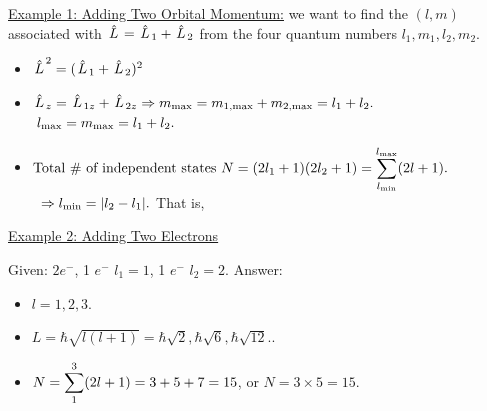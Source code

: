 \documentclass{school-22.101-notes}
\begin{document}
\uline{Example 1: Adding Two Orbital Momentum:} we want to find the $(l,m)$ associated with $\left. \hat{L} \right.= \left. \hat{L} \right._1 + \left. \hat{L} \right._2$ from the four quantum numbers $l_1, m_1, l_2, m_2$. 
\begin{itemize}
\item $\left. \hat{L} \right.^2 = (\left. \hat{L} \right._1 + \left. \hat{L} \right._2)^2 $
\item $ \left. \hat{L} \right._z = \left. \hat{L} \right._{1z} + \left. \hat{L} \right._{2z} \Rightarrow m_{\mathrm{max}} = m_{\mathrm{1,max}} + m_{\mathrm{2,max}} = l_1 + l_2.$
$\mbox{ } l_{\mathrm{max}} = m_{\mathrm{max}} = l_1 + l_2.$
\item $ \mbox{Total \# of independent states } N = (2 l_1 + 1) (2l_2 + 1) = \displaystyle\sum_{l_{\mathrm{min}}}^{l_{\mathrm{max}}} (2l+1).$
$\mbox{ }\Rightarrow l_{\mathrm{min}} = |l_2 - l_1 |.$ That is,
\end{itemize}

\uline{Example 2: Adding Two Electrons}

Given: $ 2e^-$, 1 $e^-$ \@ $l_1 = 1$, 1 $e^-$ \@ $l_2 = 2$. Answer: 
\begin{itemize}
\item $l = 1,2,3$.
\item $L = \hbar \sqrt{l (l+1)} = \hbar \sqrt{2}, \hbar \sqrt{6}, \hbar \sqrt{12}.$.
\item $N = \displaystyle\sum_1^3 (2l+1) = 3 + 5 + 7 = 15$, or $N = 3 \times 5 = 15$. 
\end{itemize}
\end{document}
